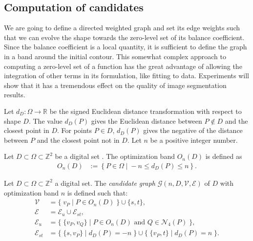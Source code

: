 \documentclass{siamart220329}
\newcommand{\digset}{D} %
\begin{document}
\subsection{Computation of candidates}\label{sec:graph-cut-model}

We are going to define a directed weighted graph and set its edge weights such
that we can evolve the shape towards the zero-level set of its balance
coefficient. Since the balance coefficient is a local quantity, it is sufficient
to define the graph in a band around the initial contour. This somewhat complex
approach to computing a zero-level set of a function has the great advantage of
allowing the integration of other terms in its formulation, like fitting to
data. Experiments will show that it has a tremendous effect on the quality of
image segmentation results.

Let $d_{\digset}:\Omega \rightarrow \mathbb{R}$ be the signed Euclidean distance
transformation with respect to shape $\digset$. The value $d_{\digset}(P)$ gives the
Euclidean distance between $P \notin \digset$ and the closest point in $\digset$. For points
$P \in \digset$, $d_{\digset}(P)$ gives the negative of the distance between $P$ and the
closest point not in $\digset$. Let $n$ be a positive integer number.

\begin{definition}
Let $\digset \subset \Omega \subset \mathbb{Z}^2$ be a digital set . The optimization
band $O_n(\digset)$ is defined as
%
%
\begin{align*}
	O_n(\digset) &:=\left\{ P \in \Omega \; | \; -n \leq d_{\digset}(P) \leq n \right\}.
\end{align*}
\end{definition}
%
%
\begin{definition}
Let $\digset \subset \Omega \subset \mathbb{Z}^2$ a digital set. The {\em candidate
graph} $\mathcal{G}(n,\digset,\mathcal{V},\mathcal{E})$ of $\digset$ with optimization
band $n$ is defined such that:
%
%
\begin{align*}
\mathcal{V} &= \big\{\; v_P \; | \; P \in O_n(\digset) \;\} \cup \{s,t \big\}, \\
\mathcal{E} &= \mathcal{E}_u \cup \mathcal{E}_{st}, \\
\mathcal{E}_u &= \big\{ \; \{v_P,v_Q\} \; | \; P \in O_n(\digset) \text{ and } Q \in \mathcal{N}_4(P) \; \big\}, \\
\mathcal{E}_{st} &= \big\{\; \{s,v_P\} \; | \; d_\digset(P)=-n \; \big\} \cup \big\{\; \{v_P,t\} \; | \; d_\digset(P)=n \; \big\}.
\end{align*}
%
%
\end{definition}
\end{document}
